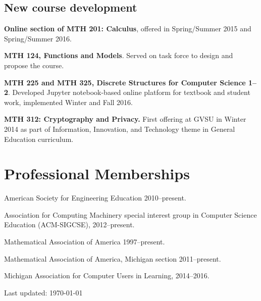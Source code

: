 \documentclass[letterpaper]{article}
\def\footerlink{}
\renewenvironment{itemize}{
  \begin{list}{}{
    \setlength{\leftmargin}{1.5em}
	\setlength{\itemsep}{0in}
  }
}{
  \end{list}
}
\begin{document}
\subsection*{New course development}
\begin{itemize}
	\item \textbf{Online section of MTH 201: Calculus}, offered in Spring/Summer 2015 and Spring/Summer 2016.
	\item \textbf{MTH 124, Functions and Models}. Served on task force to design and propose the course.
	\item \textbf{MTH 225 and MTH 325, Discrete Structures for Computer Science 1--2}. Developed Jupyter notebook-based online platform for textbook and student work, implemented Winter and Fall 2016.
	\item \textbf{MTH 312: Cryptography and Privacy. }First offering at GVSU in Winter 2014 as part of Information, Innovation, and Technology theme in General Education curriculum.
\end{itemize}


\section*{Professional Memberships}
\begin{itemize}
	\item American Society for Engineering Education 2010--present.
	\item Association for Computing Machinery special interest group in Computer Science Education (ACM-SIGCSE), 2012--present.
	\item Mathematical Association of America 1997--present.
	\item Mathematical Association of America, Michigan section 2011--present.
	\item Michigan Association for Computer Users in Learning, 2014--2016.
\end{itemize}


\bigskip

\begin{center}
  \begin{footnotesize}
    Last updated: \today \\
  \end{footnotesize}
\end{center}
\end{document}
